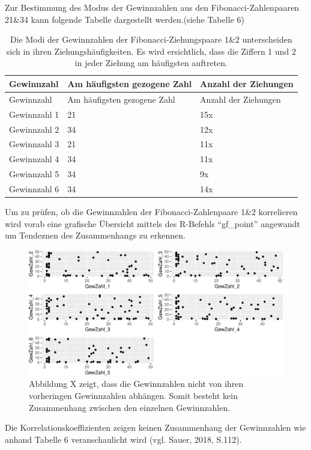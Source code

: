 \documentclass[ngerman,]{article}
\begin{document}
Zur Bestimmung des Modus der Gewinnzahlen aus den Fibonacci-Zahlenpaaren
21\&34 kann folgende Tabelle dargestellt werden.(siehe Tabelle 6)

\begin{longtable}[]{@{}lll@{}}
\caption{Die Modi der Gewinnzahlen der Fibonacci-Ziehungspaare 1\&2
unterscheiden sich in ihren Ziehungshäufigkeiten. Es wird ersichtlich,
dass die Ziffern 1 und 2 in jeder Ziehung am häufigsten
auftreten.}\tabularnewline
\toprule
Gewinnzahl & Am häufigsten gezogene Zahl & Anzahl der
Ziehungen\tabularnewline
\midrule
\endfirsthead
\toprule
Gewinnzahl & Am häufigsten gezogene Zahl & Anzahl der
Ziehungen\tabularnewline
\midrule
\endhead
Gewinnzahl 1 & 21 & 15x\tabularnewline
Gewinnzahl 2 & 34 & 12x\tabularnewline
Gewinnzahl 3 & 21 & 11x\tabularnewline
Gewinnzahl 4 & 34 & 11x\tabularnewline
Gewinnzahl 5 & 34 & 9x\tabularnewline
Gewinnzahl 6 & 34 & 14x\tabularnewline
\bottomrule
\end{longtable}

Um zu prüfen, ob die Gewinnzahlen der Fibonacci-Zahlenpaare 1\&2
korrelieren wird vorab eine grafische Übersicht mittels des R-Befehls
``gf\_point'' angewandt um Tendeznen des Zusammenhangs zu erkennen.

\begin{figure}

\includegraphics{Abbildung/Korrelation_1-1} \hfill{}

\caption{Abbildung X zeigt, dass die Gewinnzahlen nicht von ihren vorheringen Gewinnzahlen abhängen. Somit besteht kein Zusammenhang zwischen den einzelnen Gewinnzahlen.}\label{fig:Korrelation_1}
\end{figure}

Die Korrelationskoeffizienten zeigen keinen Zusammenhang der
Gewinnzahlen wie anhand Tabelle 6 veranschaulicht wird (vgl. Sauer,
2018, S.112).
\end{document}
